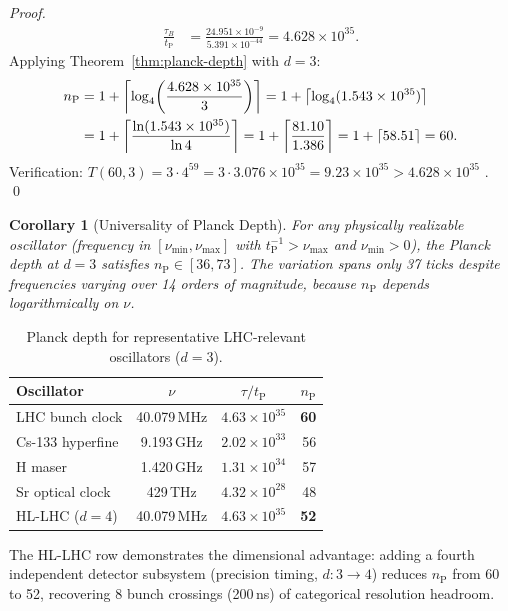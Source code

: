 \documentclass[twocolumn,10pt,a4paper]{article}
\theoremstyle{thmstyle}
\newtheorem{corollary}[theorem]{Corollary}
\theoremstyle{definition}
\theoremstyle{remark}
\newcommand{\tP}{t_{\mathrm{P}}}
\newcommand{\nP}{n_{\mathrm{P}}}
\begin{document}
\begin{proof}
\begin{align}
\frac{\tau_B}{\tP} &= \frac{24.951 \times 10^{-9}}{5.391 \times 10^{-44}}
= 4.628 \times 10^{35}.
\end{align}
Applying Theorem~\ref{thm:planck-depth} with $d = 3$:
\begin{align}
\nP &= 1 + \left\lceil\log_4\!\left(\frac{4.628 \times 10^{35}}{3}\right)\right\rceil
= 1 + \left\lceil\log_4(1.543 \times 10^{35})\right\rceil \notag\\
&= 1 + \left\lceil\frac{\ln(1.543 \times 10^{35})}{\ln 4}\right\rceil
= 1 + \left\lceil\frac{81.10}{1.386}\right\rceil
= 1 + \lceil 58.51 \rceil = 60.
\end{align}
Verification: $T(60,3) = 3 \cdot 4^{59} = 3 \cdot 3.076 \times 10^{35}
= 9.23 \times 10^{35} > 4.628 \times 10^{35}$ \checkmark. \qed
\end{proof}

\begin{corollary}[Universality of Planck Depth]
For any physically realizable oscillator (frequency in $[\nu_{\min},
\nu_{\max}]$ with $\tP^{-1} > \nu_{\max}$ and $\nu_{\min} > 0$),
the Planck depth at $d = 3$ satisfies $\nP \in [36, 73]$. The
variation spans only 37 ticks despite frequencies varying over 14
orders of magnitude, because $\nP$ depends logarithmically on $\nu$.
\end{corollary}

\begin{table}[h]
\centering
\caption{Planck depth for representative LHC-relevant oscillators ($d=3$).}
\label{tab:planck-depths}
\begin{tabular}{lccr}
\toprule
Oscillator & $\nu$ & $\tau/\tP$ & $\nP$ \\
\midrule
LHC bunch clock & 40.079\,MHz & $4.63 \times 10^{35}$ & \textbf{60} \\
Cs-133 hyperfine & 9.193\,GHz & $2.02 \times 10^{33}$ & 56 \\
H maser & 1.420\,GHz & $1.31 \times 10^{34}$ & 57 \\
Sr optical clock & 429\,THz & $4.32 \times 10^{28}$ & 48 \\
HL-LHC ($d{=}4$) & 40.079\,MHz & $4.63 \times 10^{35}$ & \textbf{52} \\
\bottomrule
\end{tabular}
\end{table}

The HL-LHC row demonstrates the dimensional advantage: adding a fourth
independent detector subsystem (precision timing, $d: 3\to 4$) reduces
$\nP$ from 60 to 52, recovering 8 bunch crossings (200\,ns) of
categorical resolution headroom.
\end{document}

